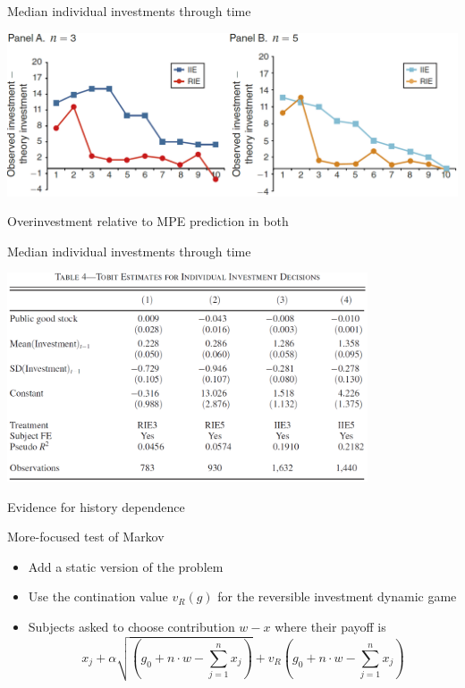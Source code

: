 \documentclass{beamer}
\begin{document}
\begin{frame}{Median individual investments through time}
\begin{card}
    \begin{center}
        \includegraphics[width=1\textwidth]{./i/BNPfig4.png}
    \end{center}
\end{card}

\begin{card}
Overinvestment relative to MPE prediction in both
    \end{card}
\end{frame}
\begin{frame}{Median individual investments through time}
\begin{card}
    \begin{center}
        \includegraphics[width=0.8\textwidth]{./i/BNPtbl4.png}
    \end{center}
\end{card}

    \begin{card}
Evidence for history dependence
    \end{card}
\end{frame}

\begin{frame}{More-focused test of Markov}
    \begin{card}
    	\begin{itemize}
        	\item Add a static version of the problem
        	\item Use the contination value  $v_R(g)$ for the reversible investment dynamic game
        	\item Subjects asked to choose contribution $w-x$ where their payoff is
    		$$ x_j+ \alpha \sqrt{\left(g_0+n\cdot w-\sum_{j=1}^n x_j\right)}+v_R\left(g_0+n\cdot w-\sum_{j=1}^n x_j \right) $$
    	\end{itemize}
    \end{card}
\end{frame}
\end{document}
